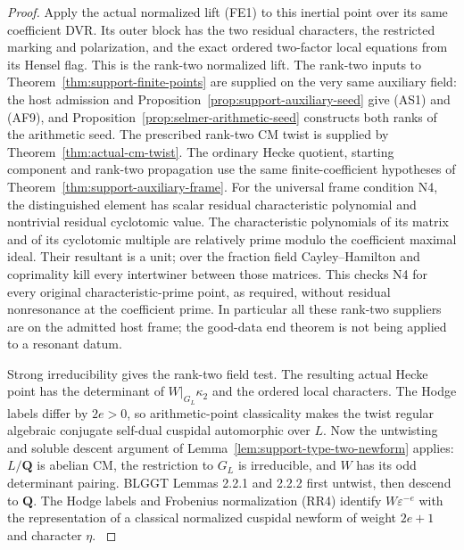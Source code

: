 \begin{proof}
Apply the actual normalized lift (FE1) to this inertial
point over its same coefficient DVR. Its outer block
has the two residual characters, the restricted marking
and polarization, and the exact ordered two-factor local
equations from its Hensel flag. This is the rank-two
normalized lift. The rank-two inputs to
Theorem~\ref{thm:support-finite-points} are supplied on
the very same auxiliary field: the host admission and
Proposition~\ref{prop:support-auxiliary-seed} give (AS1)
and (AF9), and Proposition~\ref{prop:selmer-arithmetic-seed}
constructs both ranks of the arithmetic seed.
The prescribed rank-two CM twist is supplied by
Theorem~\ref{thm:actual-cm-twist}.
The ordinary Hecke quotient, starting component and
rank-two propagation use the same finite-coefficient
hypotheses of Theorem~\ref{thm:support-auxiliary-frame}.
For the universal frame condition N4, the distinguished
element has scalar residual characteristic polynomial
and nontrivial residual cyclotomic value. The characteristic
polynomials of its matrix and of its cyclotomic multiple
are relatively prime modulo the coefficient maximal ideal.
Their resultant is a unit; over the fraction field
Cayley--Hamilton and coprimality kill every intertwiner
between those matrices. This checks N4 for every
original characteristic-prime point, as required,
without residual nonresonance at the coefficient prime.
In particular all these rank-two suppliers are on the
admitted host frame; the good-data end theorem is not
being applied to a resonant datum.

Strong irreducibility gives the rank-two field test.
The resulting actual Hecke point has the determinant
of $W|_{G_L}\kappa_2$ and the ordered local characters.
The Hodge labels differ by $2e>0$, so arithmetic-point
classicality makes the twist regular algebraic
conjugate self-dual cuspidal automorphic over $L$.
Now the untwisting and soluble descent argument of
Lemma~\ref{lem:support-type-two-newform} applies:
$L/\mathbf Q$ is abelian CM, the restriction to $G_L$
is irreducible, and $W$ has its odd determinant pairing.
BLGGT Lemmas 2.2.1 and 2.2.2 first untwist, then descend
to $\mathbf Q$. The Hodge labels and Frobenius
normalization (RR4) identify $W\varepsilon^{-e}$ with
the representation of a classical normalized cuspidal
newform of weight $2e+1$ and character $\eta$.
\cite{support-type-two-blggt,support-type-two-kato}


\end{proof}
